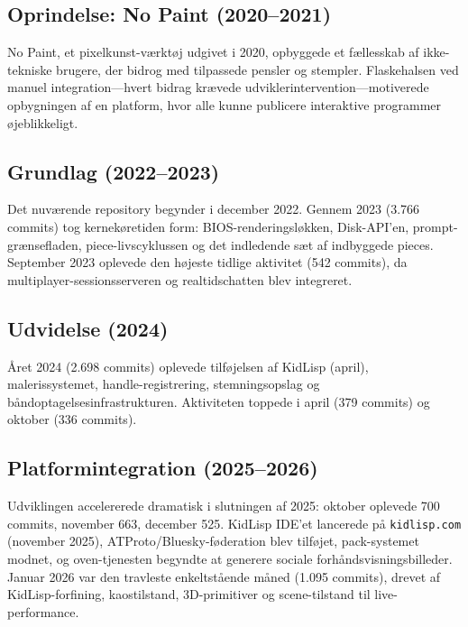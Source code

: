 \documentclass[10pt,letterpaper,twocolumn]{article}
\begin{document}
\subsection{Oprindelse: No Paint (2020--2021)}

No Paint, et pixelkunst-værktøj udgivet i 2020, opbyggede et fællesskab af ikke-tekniske brugere, der bidrog med tilpassede pensler og stempler. Flaskehalsen ved manuel integration---hvert bidrag krævede udviklerintervention---motiverede opbygningen af en platform, hvor alle kunne publicere interaktive programmer øjeblikkeligt.

\subsection{Grundlag (2022--2023)}

Det nuværende repository begynder i december 2022. Gennem 2023 (3.766 commits) tog kernekøretiden form: BIOS-renderingsløkken, Disk-API'en, prompt-grænsefladen, piece-livscyklussen og det indledende sæt af indbyggede pieces. September 2023 oplevede den højeste tidlige aktivitet (542 commits), da multiplayer-sessionsserveren og realtidschatten blev integreret.

\subsection{Udvidelse (2024)}

Året 2024 (2.698 commits) oplevede tilføjelsen af KidLisp (april), malerissystemet, handle-registrering, stemningsopslag og båndoptagelsesinfrastrukturen. Aktiviteten toppede i april (379 commits) og oktober (336 commits).

\subsection{Platformintegration (2025--2026)}

Udviklingen accelererede dramatisk i slutningen af 2025: oktober oplevede 700 commits, november 663, december 525. KidLisp IDE'et lancerede på \texttt{kidlisp.com} (november 2025), ATProto/Bluesky-føderation blev tilføjet, pack-systemet modnet, og oven-tjenesten begyndte at generere sociale forhåndsvisningsbilleder. Januar 2026 var den travleste enkeltstående måned (1.095 commits), drevet af KidLisp-forfining, kaostilstand, 3D-primitiver og scene-tilstand til live-performance.
\end{document}
